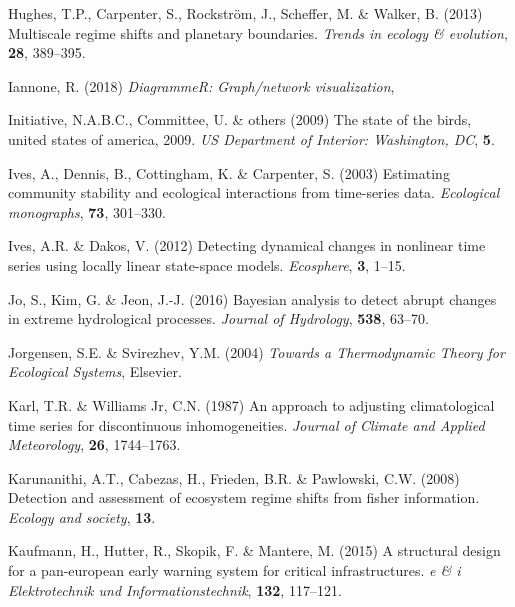 \documentclass[12pt,twoside,openany]{reedthesis}
\begin{document}
\leavevmode\hypertarget{ref-hughes2013multiscale}{}%
Hughes, T.P., Carpenter, S., Rockström, J., Scheffer, M. \& Walker, B. (2013) Multiscale regime shifts and planetary boundaries. \emph{Trends in ecology \& evolution}, \textbf{28}, 389--395.

\leavevmode\hypertarget{ref-DiagrammeR}{}%
Iannone, R. (2018) \emph{DiagrammeR: Graph/network visualization},

\leavevmode\hypertarget{ref-north2009state}{}%
Initiative, N.A.B.C., Committee, U. \& others (2009) The state of the birds, united states of america, 2009. \emph{US Department of Interior: Washington, DC}, \textbf{5}.

\leavevmode\hypertarget{ref-ives2003estimating}{}%
Ives, A., Dennis, B., Cottingham, K. \& Carpenter, S. (2003) Estimating community stability and ecological interactions from time-series data. \emph{Ecological monographs}, \textbf{73}, 301--330.

\leavevmode\hypertarget{ref-ives2012detecting}{}%
Ives, A.R. \& Dakos, V. (2012) Detecting dynamical changes in nonlinear time series using locally linear state-space models. \emph{Ecosphere}, \textbf{3}, 1--15.

\leavevmode\hypertarget{ref-jo2016bayesian}{}%
Jo, S., Kim, G. \& Jeon, J.-J. (2016) Bayesian analysis to detect abrupt changes in extreme hydrological processes. \emph{Journal of Hydrology}, \textbf{538}, 63--70.

\leavevmode\hypertarget{ref-jorgensen_towards_2004}{}%
Jorgensen, S.E. \& Svirezhev, Y.M. (2004) \emph{Towards a Thermodynamic Theory for Ecological Systems}, Elsevier.

\leavevmode\hypertarget{ref-karl1987approach}{}%
Karl, T.R. \& Williams Jr, C.N. (1987) An approach to adjusting climatological time series for discontinuous inhomogeneities. \emph{Journal of Climate and Applied Meteorology}, \textbf{26}, 1744--1763.

\leavevmode\hypertarget{ref-karunanithi_detection_2008}{}%
Karunanithi, A.T., Cabezas, H., Frieden, B.R. \& Pawlowski, C.W. (2008) Detection and assessment of ecosystem regime shifts from fisher information. \emph{Ecology and society}, \textbf{13}.

\leavevmode\hypertarget{ref-kaufmann2015structural}{}%
Kaufmann, H., Hutter, R., Skopik, F. \& Mantere, M. (2015) A structural design for a pan-european early warning system for critical infrastructures. \emph{e \& i Elektrotechnik und Informationstechnik}, \textbf{132}, 117--121.
\end{document}

